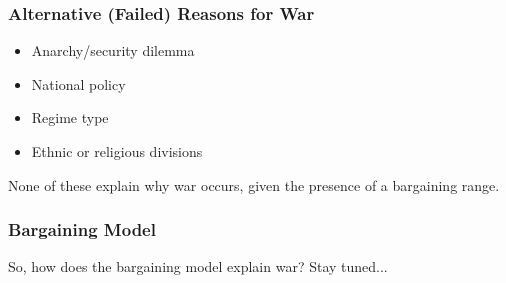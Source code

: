 \documentclass[handout]{beamer}
\begin{document}
\begin{frame} 
	\frametitle{\LARGE{Alternative (Failed) Reasons for War}}
	\begin{itemize}
		\item Anarchy/security dilemma \pause
		\item National policy \pause
		\item Regime type \pause
		\item Ethnic or religious divisions \pause	
	\end{itemize}
None of these explain why war occurs, given the presence of a bargaining range.
\end{frame}

\begin{frame} 
\frametitle{\LARGE{Bargaining Model}}
So, how does the bargaining model explain war? Stay tuned...
\end{frame}
\end{document}
